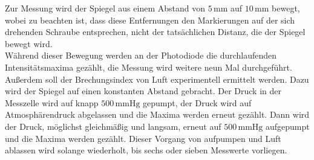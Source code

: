 Zur Messung wird der Spiegel aus einem Abstand von $5 \,\si{\milli\meter}$ auf $10 \,\si{\milli\meter}$ bewegt, wobei zu beachten ist, 
dass diese Entfernungen den Markierungen auf der sich drehenden Schraube entsprechen, nicht der tatsächlichen Distanz, die der Spiegel bewegt wird. \\

Während dieser Bewegung werden an der Photodiode die durchlaufenden Intensitätsmaxima gezählt, die Messung wird weitere neun Mal durchgeführt. \\

Außerdem soll der Brechungsindex von Luft experimentell ermittelt werden.
Dazu wird der Spiegel auf einen konstanten Abstand gebracht.
Der Druck in der Messzelle wird auf knapp $500 \, \si{\milli\meter}\text{Hg}$ gepumpt, der Druck wird auf Atmosphärendruck abgelassen und die Maxima werden erneut gezählt.
Dann wird der Druck, möglichst gleichmäßig und langsam, erneut auf $500 \, \si{\milli\meter}\text{Hg}$ aufgepumpt und die Maxima werden gezählt.
Dieser Vorgang von aufpumpen und Luft ablassen wird solange wiederholt, bis sechs oder sieben Messwerte vorliegen.




